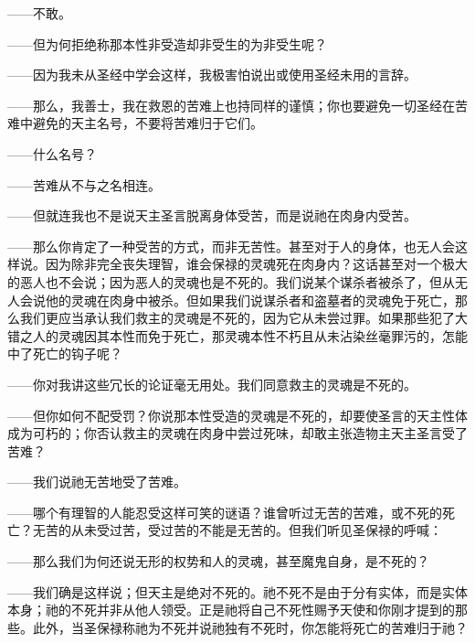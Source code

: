 ——不敢。\par

——但为何拒绝称那本性非受造却非受生的为非受生呢？\par

——因为我未从圣经中学会这样，我极害怕说出或使用圣经未用的言辞。\par

——那么，我善士，我在救恩的苦难上也持同样的谨慎；你也要避免一切圣经在苦难中避免的天主名号，不要将苦难归于它们。\par

——什么名号？\par

——苦难从不与之名相连。\par

——但就连我也不是说天主圣言脱离身体受苦，而是说祂在肉身内受苦。\par

——那么你肯定了一种受苦的方式，而非无苦性。甚至对于人的身体，也无人会这样说。因为除非完全丧失理智，谁会保禄的灵魂死在肉身内？这话甚至对一个极大的恶人也不会说；因为恶人的灵魂也是不死的。我们说某个谋杀者被杀了，但从无人会说他的灵魂在肉身中被杀。但如果我们说谋杀者和盗墓者的灵魂免于死亡，那么我们更应当承认我们救主的灵魂是不死的，因为它从未尝过罪。如果那些犯了大错之人的灵魂因其本性而免于死亡，那灵魂本性不朽且从未沾染丝毫罪污的，怎能中了死亡的钩子呢？\par

——你对我讲这些冗长的论证毫无用处。我们同意救主的灵魂是不死的。\par

——但你如何不配受罚？你说那本性受造的灵魂是不死的，却要使圣言的天主性体成为可朽的；你否认救主的灵魂在肉身中尝过死味，却敢主张造物主天主圣言受了苦难？\par

——我们说祂无苦地受了苦难。\par

——哪个有理智的人能忍受这样可笑的谜语？谁曾听过无苦的苦难，或不死的死亡？无苦的从未受过苦，受过苦的不能是无苦的。但我们听见圣保禄的呼喊：\par

——那么我们为何还说无形的权势和人的灵魂，甚至魔鬼自身，是不死的？\par

——我们确是这样说；但天主是绝对不死的。祂不死不是由于分有实体，而是实体本身；祂的不死并非从他人领受。正是祂将自己不死性赐予天使和你刚才提到的那些。此外，当圣保禄称祂为不死并说祂独有不死时，你怎能将死亡的苦难归于祂？\par

